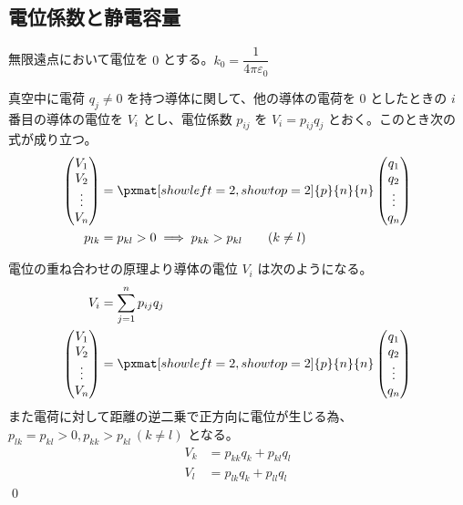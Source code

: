 \documentclass[uplatex,dvipdfmx,a4paper,11pt]{jlreq}
\makeatletter
\newcommand\mqty[1]{\begin{pmatrix}#1\end{pmatrix}}
\theoremstyle{definition}
\renewenvironment{proof}[1][\proofname]{\par
  \normalfont
  \topsep6\p@\@plus6\p@ \trivlist
  \item[\hskip\labelsep{\bfseries #1}\@addpunct{\bfseries}]\ignorespaces\quad\par
}{%
  \qed\endtrivlist\@endpefalse
}
\renewcommand\proofname{証明}
\makeatother
\begin{document}
\subsection{電位係数と静電容量}
無限遠点において電位を $0$ とする。$k_0 = \dfrac{1}{4\pi\varepsilon_0}$
\begin{problem}
真空中に電荷 $q_j \neq 0$ を持つ導体に関して、他の導体の電荷を $0$ としたときの $i$ 番目の導体の電位を $V_i$ とし、電位係数 $p_{ij}$ を $V_i = p_{ij}q_j$ とおく。このとき次の式が成り立つ。
\begin{align}
  \mqty{V_1                                                       \\ V_2 \\ \vdots \\ V_n} & = \pxmat[showleft=2,showtop=2]{p}{n}{n}\mqty{q_1 \\ q_2 \\ \vdots \\ q_n} \\
  p_{lk} & = p_{kl} > 0 \implies p_{kk} > p_{kl} \qquad (k\neq l)
\end{align}
\end{problem}
\begin{proof}
  電位の重ね合わせの原理より導体の電位 $V_i$ は次のようになる。
  \begin{align}
    V_i & = \sum_{j=1}^{n}p_{ij}q_j \\
    \mqty{V_1                       \\ V_2 \\ \vdots \\ V_n} & = \pxmat[showleft=2,showtop=2]{p}{n}{n}\mqty{q_1 \\ q_2 \\ \vdots \\ q_n}
  \end{align}
  また電荷に対して距離の逆二乗で正方向に電位が生じる為、$p_{lk} = p_{kl} > 0, p_{kk} > p_{kl}\ (k\neq l)$ となる。
  \begin{align}
    V_k & = p_{kk}q_k + p_{kl}q_l \\
    V_l & = p_{lk}q_k + p_{ll}q_l
  \end{align}
\end{proof}
\end{document}
